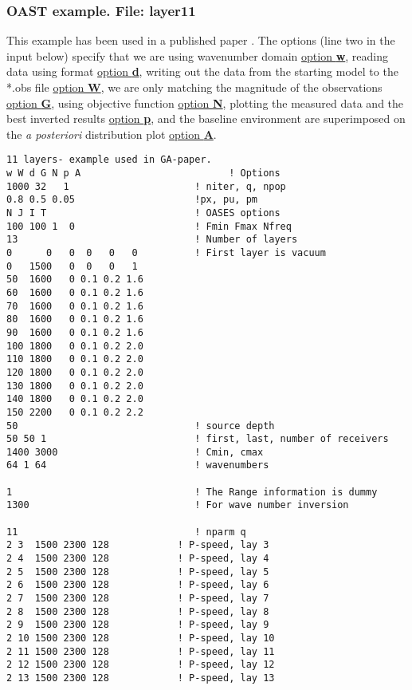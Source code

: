 \documentclass{saclantc}
\begin{document}
\subsubsection{OAST example. File: {\bf layer11}}
\label{se:layer11}
This example has been used in a published paper \cite{gerstoft:asa94}.
The options (line two in the input below) 
specify that we are using wavenumber domain  \underline{option {\bf w}}, 
reading data using format \underline{option {\bf d}}, writing out the data from the starting model to the *.obs
file \underline{option {\bf W}}, we are only matching the magnitude of
the observations  \underline{option {\bf G}},  using objective
function \underline{option {\bf N}},  plotting 
the measured data and the best inverted results \underline{option {\bf
p}}, and the baseline environment are superimposed on the {\it a
posteriori} distribution plot \underline{option {\bf A}}.
\small
\begin{verbatim}
11 layers- example used in GA-paper.
w W d G N p A                          ! Options
1000 32   1                      ! niter, q, npop
0.8 0.5 0.05                     !px, pu, pm
N J I T                          ! OASES options
100 100 1  0                     ! Fmin Fmax Nfreq
13                               ! Number of layers
0      0   0  0   0   0          ! First layer is vacuum
0   1500   0  0   0   1  
50  1600   0 0.1 0.2 1.6 
60  1600   0 0.1 0.2 1.6 
70  1600   0 0.1 0.2 1.6 
80  1600   0 0.1 0.2 1.6 
90  1600   0 0.1 0.2 1.6 
100 1800   0 0.1 0.2 2.0 
110 1800   0 0.1 0.2 2.0 
120 1800   0 0.1 0.2 2.0 
130 1800   0 0.1 0.2 2.0 
140 1800   0 0.1 0.2 2.0 
150 2200   0 0.1 0.2 2.2 
50                               ! source depth
50 50 1                          ! first, last, number of receivers
1400 3000                        ! Cmin, cmax
64 1 64                          ! wavenumbers

1                                ! The Range information is dummy
1300                             ! For wave number inversion

11                               ! nparm q
2 3  1500 2300 128            ! P-speed, lay 3           
2 4  1500 2300 128            ! P-speed, lay 4           
2 5  1500 2300 128            ! P-speed, lay 5           
2 6  1500 2300 128            ! P-speed, lay 6           
2 7  1500 2300 128            ! P-speed, lay 7           
2 8  1500 2300 128            ! P-speed, lay 8           
2 9  1500 2300 128            ! P-speed, lay 9           
2 10 1500 2300 128            ! P-speed, lay 10           
2 11 1500 2300 128            ! P-speed, lay 11           
2 12 1500 2300 128            ! P-speed, lay 12           
2 13 1500 2300 128            ! P-speed, lay 13           
\end{verbatim}
\normalsize
\end{document}
